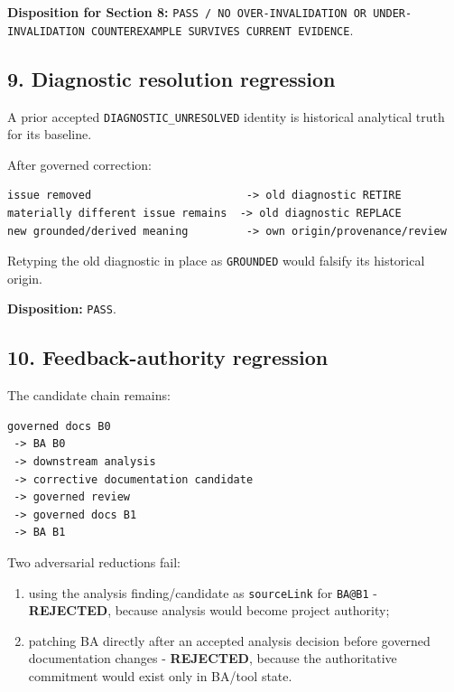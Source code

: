 \documentclass[11pt,a4paper]{article}
\providecommand{\tightlist}{\setlength{\itemsep}{0pt}\setlength{\parskip}{0pt}}
\begin{document}
\textbf{Disposition for Section 8:} \texttt{PASS\ /\ NO\ OVER-INVALIDATION\ OR\ UNDER-INVALIDATION\ COUNTEREXAMPLE\ SURVIVES\ CURRENT\ EVIDENCE}.

\subsection{9. Diagnostic resolution regression}\label{diagnostic-resolution-regression}

A prior accepted \texttt{DIAGNOSTIC\_UNRESOLVED} identity is historical analytical truth for its baseline.

After governed correction:

\begin{verbatim}
issue removed                        -> old diagnostic RETIRE
materially different issue remains  -> old diagnostic REPLACE
new grounded/derived meaning         -> own origin/provenance/review
\end{verbatim}

Retyping the old diagnostic in place as \texttt{GROUNDED} would falsify its historical origin.

\textbf{Disposition:} \texttt{PASS}.

\subsection{10. Feedback-authority regression}\label{feedback-authority-regression}

The candidate chain remains:

\begin{verbatim}
governed docs B0
 -> BA B0
 -> downstream analysis
 -> corrective documentation candidate
 -> governed review
 -> governed docs B1
 -> BA B1
\end{verbatim}

Two adversarial reductions fail:

\begin{enumerate}
\def\labelenumi{\arabic{enumi}.}
\tightlist
\item
  using the analysis finding/candidate as \texttt{sourceLink} for \texttt{BA@B1} - \textbf{REJECTED}, because analysis would become project authority;
\item
  patching BA directly after an accepted analysis decision before governed documentation changes - \textbf{REJECTED}, because the authoritative commitment would exist only in BA/tool state.
\end{enumerate}
\end{document}
